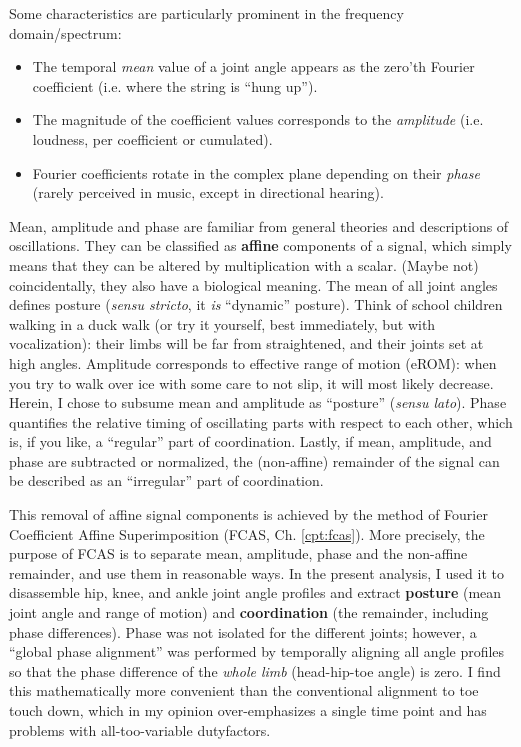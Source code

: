 Some characteristics are particularly prominent in the frequency domain/spectrum:
\begin{itemize}
\item The temporal \emph{mean} value of a joint angle appears as the zero'th Fourier coefficient (i.e. where the string is ``hung up'').
\item The magnitude of the coefficient values corresponds to the \emph{amplitude} (i.e. loudness, per coefficient or cumulated).
\item Fourier coefficients rotate in the complex plane depending on their \emph{phase} (rarely perceived in music, except in directional hearing).
\end{itemize}


Mean, amplitude and phase are familiar from general theories and descriptions of oscillations.
They can be classified as \textbf{affine} components of a signal, which simply means that they can be altered by multiplication with a scalar.
(Maybe not) coincidentally, they also have a biological meaning.
The mean of all joint angles defines posture (\emph{sensu stricto}, it \emph{is} ``dynamic'' posture).
Think of school children walking in a duck walk (or try it yourself, best immediately, but with vocalization): their limbs will be far from straightened, and their joints set at high angles.
Amplitude corresponds to effective range of motion (eROM): when you try to walk over ice with some care to not slip, it will most likely decrease.
Herein, I chose to subsume mean and amplitude as ``posture'' (\emph{sensu lato}).
Phase quantifies the relative timing of oscillating parts with respect to each other, which is, if you like, a ``regular'' part of coordination.
Lastly, if mean, amplitude, and phase are subtracted or normalized, the (non-affine) remainder of the signal can be described as an ``irregular'' part of coordination.

This removal of affine signal components is achieved by the method of Fourier Coefficient Affine Superimposition (FCAS, Ch. \ref{cpt:fcas}).
More precisely, the purpose of FCAS is to separate mean, amplitude, phase and the non-affine remainder, and use them in reasonable ways.
In the present analysis, I used it to disassemble hip, knee, and ankle joint angle profiles and extract \textbf{posture} (mean joint angle and range of motion) and \textbf{coordination} (the remainder, including phase differences).
Phase was not isolated for the different joints; however, a ``global phase alignment'' was performed by temporally aligning all  angle profiles so that the phase difference of the \emph{whole limb} (head-hip-toe angle) is zero.
I find this mathematically more convenient than the conventional alignment to toe touch down, which in my opinion over-emphasizes a single time point and has problems with all-too-variable dutyfactors.

